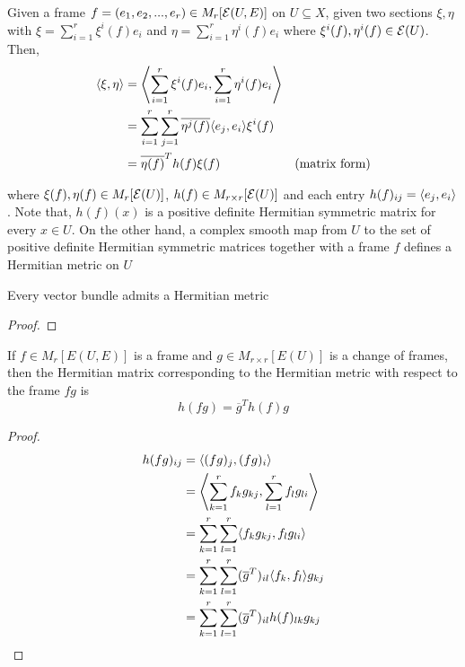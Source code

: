 \begin{definition}
	Given a frame $f = \tuple{e_1, e_2, ..., e_r} \in M_r[\E(U, E)]$ on $U \subseteq X$, given two sections $\xi, \eta$ with $\xi = \sum_{i=1}^r \xi^i(f) e_i$ and $\eta = \sum_{i=1}^r \eta^i(f) e_i$ where $\xi^i(f), \eta^i(f) \in \E(U)$. Then,
	\begin{align*}
		\inner{\xi, \eta} 
		&= \inner*{\sum_{i=1}^r \xi^i(f) e_i, \sum_{i=1}^r \eta^i(f) e_i} \\
		&= \sum_{i=1}^r \sum_{j=1}^r \overline{\eta^j(f)} \inner{e_j, e_i} \xi^i(f) \\
		&= \overline{\eta(f)}^T h(f) \xi(f) &\text{(matrix form)}
	\end{align*}
	
	where $\xi(f), \eta(f) \in M_r[\E(U)]$, $h(f) \in M_{r \times r}[\E(U)]$ and each entry $h(f)_{ij} = \inner{e_j, e_i}$. Note that, $h(f)(x)$ is a positive definite Hermitian symmetric matrix for every $x \in U$. On the other hand, a complex smooth map from $U$ to the set of positive definite Hermitian symmetric matrices together with a frame $f$ defines a Hermitian metric on $U$
\end{definition}


\begin{theorem}
	Every vector bundle admits a Hermitian metric
	\begin{proof}
	\end{proof}
\end{theorem}

\begin{proposition}
	If $f \in M_r[E(U, E)]$ is a frame and $g \in M_{r \times r}[E(U)]$ is a change of frames, then the Hermitian matrix corresponding to the Hermitian metric with respect to the frame $fg$ is
	$$
	h(fg) = \overline{g}^T h(f) g
	$$
	\begin{proof}
		\begin{align*}
			h(fg)_{ij}
			&= \inner{(fg)_j, (fg)_i} \\
			&= \inner*{\sum_{k=1}^r f_k g_{kj}, \sum_{l=1}^r f_l g_{li}} \\
			&= \sum_{k=1}^r \sum_{l=1}^r \inner{f_k g_{kj}, f_l g_{li}} \\
			&= \sum_{k=1}^r \sum_{l=1}^r (\overline{g}^T)_{il} \inner{f_k, f_l} g_{kj} \\
			&= \sum_{k=1}^r \sum_{l=1}^r (\overline{g}^T)_{il} h(f)_{lk} g_{kj} \\
		\end{align*}
	\end{proof}
\end{proposition}

